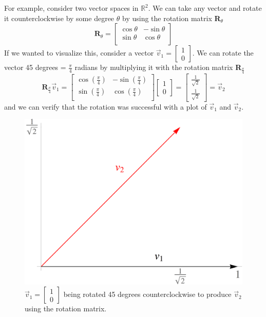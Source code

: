 \documentclass{article}
\begin{document}
For example, consider two vector spaces in $\mathbb{R}^2$.
We can take any vector and rotate it counterclockwise by some degree $\theta$ by using the rotation matrix \textbf{R}$_{\theta}$
\begin{equation}
  \textbf{R}_{\theta} =
  \begin{bmatrix}
    \cos{\theta} & -\sin{\theta}\\
    \sin{\theta} & \cos{\theta} \\
  \end{bmatrix}
\end{equation}
If we wanted to visualize this, consider a vector $\vec{v}_1 = \begin{bmatrix} 1 \\ 0 \end{bmatrix}$.
We can rotate the vector 45 degrees = $\frac{\pi}{4}$ radians by multiplying it with the rotation matrix \textbf{R}$_\frac{\pi}{4}$
\begin{equation}
  \textbf{R}_\frac{\pi}{4} \vec{v}_1 =
  \begin{bmatrix}
    \cos{( \frac{\pi}{4} )} & -\sin{( \frac{\pi}{4} )}\\[6pt]
    \sin{( \frac{\pi}{4} )} & \cos{( \frac{\pi}{4} )} \\
  \end{bmatrix}
  \begin{bmatrix}
    1 \\ 0
  \end{bmatrix}
  =
  \begin{bmatrix}
    \frac{1}{\sqrt{2}} \\[6pt] \frac{1}{\sqrt{2}}
  \end{bmatrix}
  = \vec{v}_2
\end{equation}
and we can verify that the rotation was successful with a plot of $\vec{v}_1$ and $\vec{v}_2$.
\begin{figure}[H]
  \centering
  \includegraphics[scale=0.7]{Figures/rotation.png}
    \caption{$\vec{v}_1 = \begin{bmatrix} 1 \\ 0 \end{bmatrix}$ being rotated 45 degrees counterclockwise to produce $\vec{v}_2$ using the rotation matrix.}
  \label{fig:rotation}
\end{figure}
\end{document}
